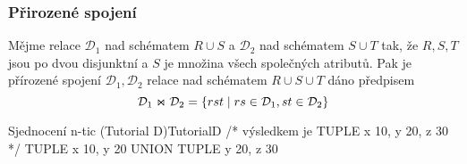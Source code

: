 \subsubsection{Přirozené spojení}
\begin{uptheorem}
Mějme relace $\mathcal{D}_{1}$ nad schématem $R \cup S$ a $\mathcal{D}_{2}$ nad schématem $S \cup T$ tak, že $R, S, T$ jsou po dvou disjunktní a $S$ je množina všech společných atributů. Pak je přírozené spojení $\mathcal{D}_{1}, \mathcal{D}_{2}$ relace nad schématem $R \cup S \cup T$ dáno předpisem
$$
\mathcal{D}_{1} \Join \mathcal{D}_{2} = \lbrace rst \thickspace | \thickspace rs \in \mathcal{D}_{1}, st \in \mathcal{D}_{2} \rbrace
$$
\end{uptheorem}
\begin{upcode}{Sjednocení n-tic (Tutorial D)}{}{TutorialD}
/* výsledkem je TUPLE {x 10, y 20, z 30} */
TUPLE {x 10, y 20} UNION TUPLE {y 20, z 30}
\end{upcode}
